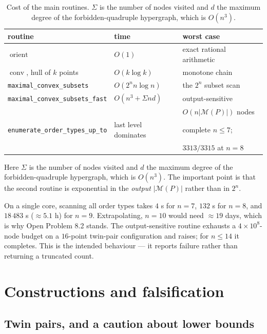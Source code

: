 \documentclass[11pt,a4paper]{article}
\theoremstyle{definition}
\newcommand{\conv}{\operatorname{conv}}
\newcommand{\M}{\mathcal{M}}
\begin{document}
\begin{table}[ht]
\centering
\caption{Cost of the main routines.  $\Sigma$ is the number of nodes visited and
$d$ the maximum degree of the forbidden-quadruple hypergraph, which is
$O(n^3)$.}
\label{tab:cost}
\small
\begin{tabular}{@{}lll@{}}
\toprule
routine & time & worst case \\
\midrule
$\operatorname{orient}$ & $O(1)$ & exact rational arithmetic \\
$\conv$, hull of $k$ points & $O(k\log k)$ & monotone chain \\
\texttt{maximal\_convex\_\allowbreak subsets}
  & $O(2^n n\log n)$ & the $2^n$ subset scan \\
\texttt{maximal\_convex\_\allowbreak subsets\_fast}
  & $O(n^3+\Sigma n d)$ & output-sensitive \\
  & & $O(n|\M(P)|)$ nodes \\
\texttt{enumerate\_order\_\allowbreak types\_up\_to}
  & last level dominates & complete $n\le 7$; \\
  & & $3313/3315$ at $n=8$ \\
\bottomrule
\end{tabular}
\end{table}

Here $\Sigma$ is the number of nodes visited and $d$ the maximum degree of the
forbidden-quadruple hypergraph, which is $O(n^3)$.  The important point is that the
second routine is exponential in the \emph{output} $|\M(P)|$ rather than in $2^n$.

On a single core, scanning all order types takes $4$ s for $n=7$, $132$ s for
$n=8$, and $18\,483$ s ($\approx 5.1$ h) for $n=9$.  Extrapolating, $n=10$
would need $\approx 19$ days, which is why Open Problem 8.2 stands.  The
output-sensitive routine exhausts a $4\times 10^8$-node budget on a $16$-point
twin-pair configuration and raises; for $n\le 14$ it completes.  This is the
intended behaviour --- it reports failure rather than returning a truncated count.

\section{Constructions and falsification}
\label{sec:twin}

\subsection{Twin pairs, and a caution about lower bounds}
\end{document}
